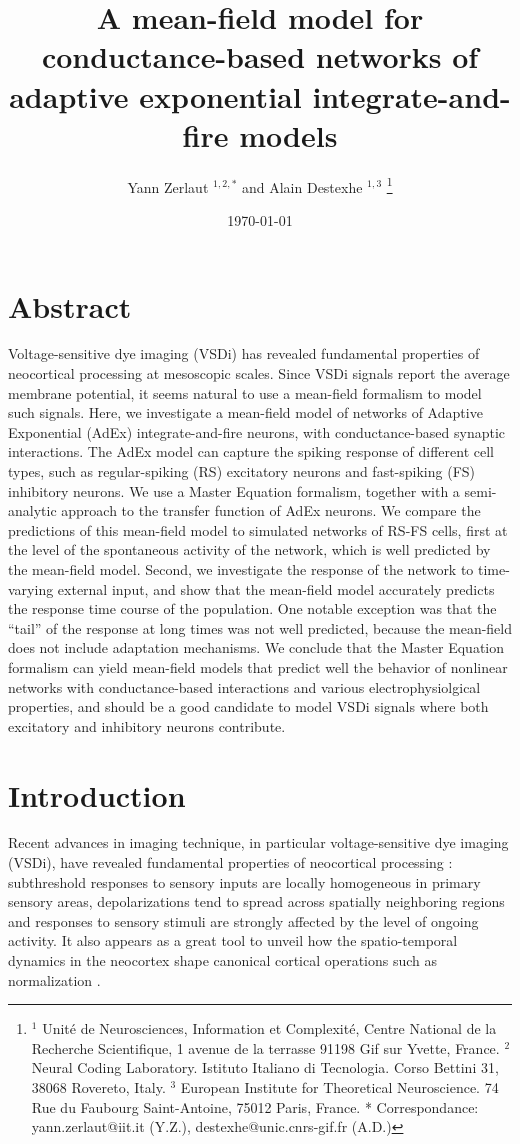 \documentclass[8pt, colorlinks, a4paper]{article}
\author{Yann Zerlaut \(^{1,2,*}\) and Alain Destexhe \(^{1,3}\)
  \footnote{$^1$ Unit\'e de Neurosciences, Information et
    Complexit\'e, Centre National de la Recherche Scientifique, 1
    avenue de la terrasse 91198 Gif sur Yvette, France. $^2$ Neural
    Coding Laboratory. Istituto Italiano di Tecnologia. Corso Bettini
    31, 38068 Rovereto, Italy. $^3$ European Institute for Theoretical
    Neuroscience. 74 Rue du Faubourg Saint-Antoine, 75012 Paris,
    France. * Correspondance: yann.zerlaut@iit.it (Y.Z.),
    destexhe@unic.cnrs-gif.fr (A.D.) \normalsize }}
\date{\today}
\title{A mean-field model for conductance-based networks of adaptive
  exponential integrate-and-fire models}
\begin{document}
\maketitle


\section{Abstract}
\label{sec-1}
\bfseries

Voltage-sensitive dye imaging (VSDi) has revealed fundamental properties of neocortical processing at mesoscopic scales.  Since VSDi signals report the average membrane potential, it seems natural to use a mean-field formalism to model such signals.  Here, we investigate a mean-field model of networks of Adaptive Exponential (AdEx) integrate-and-fire neurons, with conductance-based synaptic interactions.  The AdEx model can capture the spiking response of different cell types, such as regular-spiking (RS) excitatory neurons and fast-spiking (FS) inhibitory neurons.  We use a Master Equation formalism, together with a semi-analytic approach to the transfer function of AdEx neurons.  We compare the predictions of this mean-field model to simulated networks of RS-FS cells, first at the level of the spontaneous activity of the network, which is well predicted by the mean-field model.  Second, we investigate the response of the network to time-varying external input, and show that the mean-field model accurately predicts the response time course of the population.  One notable exception was that the ``tail'' of the response at long times was not well predicted, because the mean-field does not include adaptation mechanisms.  We conclude that the Master Equation formalism can yield mean-field models that predict well the behavior of nonlinear networks with conductance-based interactions and various electrophysiolgical properties, and should be a good candidate to model VSDi signals where both excitatory and inhibitory neurons contribute.

\normalfont

\section{Introduction}
\label{sec-2}
\normalfont

Recent advances in imaging technique, in particular voltage-sensitive
dye imaging (VSDi), have revealed fundamental properties of
neocortical processing
\cite{Arieli1996,Contreras2001,Petersen2001,Ferezou2006,Civillico2012}:
subthreshold responses to sensory inputs are locally homogeneous in
primary sensory areas, depolarizations tend to spread across spatially
neighboring regions and responses to sensory stimuli are strongly
affected by the level of ongoing activity. It also appears as a great
tool to unveil how the spatio-temporal dynamics in the neocortex shape
canonical cortical operations such as normalization
\cite{Reynaud2012}.
\end{document}
